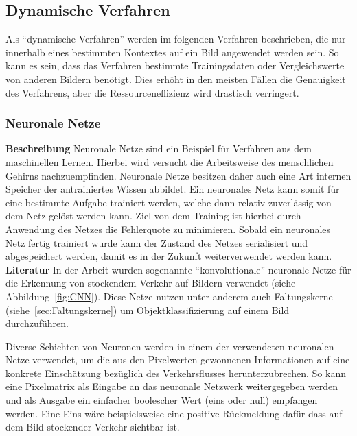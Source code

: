 \subsection{Dynamische Verfahren}
Als "`dynamische Verfahren"' werden im folgenden Verfahren beschrieben, die nur innerhalb eines bestimmten Kontextes auf ein Bild angewendet werden sein. So kann es sein, dass das Verfahren bestimmte Trainingsdaten oder Vergleichswerte von anderen Bildern benötigt. Dies erhöht in den meisten Fällen die Genauigkeit des Verfahrens, aber die Ressourceneffizienz wird drastisch verringert.
\subsubsection{Neuronale Netze}
\textbf{Beschreibung}\newline
Neuronale Netze sind ein Beispiel für Verfahren aus dem maschinellen Lernen.
Hierbei wird versucht die Arbeitsweise des menschlichen Gehirns nachzuempfinden.
Neuronale Netze besitzen daher auch eine Art internen Speicher der antrainiertes Wissen abbildet.
Ein neuronales Netz kann somit für eine bestimmte Aufgabe trainiert werden, welche dann relativ zuverlässig von dem Netz gelöst werden kann.
Ziel von dem Training ist hierbei durch Anwendung des Netzes die Fehlerquote zu minimieren.
Sobald ein neuronales Netz fertig trainiert wurde kann der Zustand des Netzes serialisiert und abgespeichert werden, damit es in der Zukunft weiterverwendet werden kann.
\newline\newline
\textbf{Literatur}\newline
In der Arbeit \cite{hkkDhbw} wurden sogenannte "`konvolutionale"' neuronale Netze für die Erkennung von stockendem Verkehr auf Bildern verwendet (siehe Abbildung~\ref{fig:CNN}).
Diese Netze nutzen unter anderem auch Faltungskerne (siehe~\ref{sec:Faltungskerne}) um Objektklassifizierung auf einem Bild durchzuführen.

Diverse Schichten von Neuronen werden in einem der verwendeten neuronalen Netze verwendet, um die aus den Pixelwerten gewonnenen Informationen auf eine konkrete Einschätzung bezüglich des Verkehrsflusses herunterzubrechen.
So kann eine Pixelmatrix als Eingabe an das neuronale Netzwerk weitergegeben werden und als Ausgabe ein einfacher boolescher Wert (eins oder null) empfangen werden. 
Eine Eins wäre beispielsweise eine positive Rückmeldung dafür dass auf dem Bild stockender Verkehr sichtbar ist.

